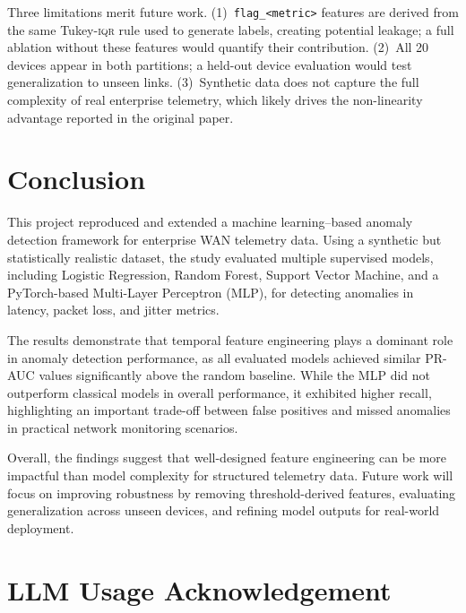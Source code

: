 \documentclass{article}
\newcommand{\iqr}{\textsc{iqr}\xspace}
\begin{document}
Three limitations merit future work.
(1)~\texttt{flag\_<metric>} features are derived from the same Tukey-\iqr rule used
to generate labels, creating potential leakage; a full ablation without these features
would quantify their contribution.
(2)~All 20 devices appear in both partitions; a held-out device evaluation would test
generalization to unseen links.
(3)~Synthetic data does not capture the full complexity of real enterprise telemetry,
which likely drives the non-linearity advantage reported in the original paper.

\section{Conclusion}
\label{sec:conclusion}
This project reproduced and extended a machine learning–based anomaly detection 
framework for enterprise WAN telemetry data. Using a synthetic but statistically 
realistic dataset, the study evaluated multiple supervised models, including 
Logistic Regression, Random Forest, Support Vector Machine, and a PyTorch-based 
Multi-Layer Perceptron (MLP), for detecting anomalies in latency, packet loss, 
and jitter metrics.

The results demonstrate that temporal feature engineering plays a dominant role 
in anomaly detection performance, as all evaluated models achieved similar PR-AUC 
values significantly above the random baseline. While the MLP did not outperform 
classical models in overall performance, it exhibited higher recall, highlighting 
an important trade-off between false positives and missed anomalies in practical 
network monitoring scenarios.

Overall, the findings suggest that well-designed feature engineering can be more 
impactful than model complexity for structured telemetry data. Future work will 
focus on improving robustness by removing threshold-derived features, evaluating 
generalization across unseen devices, and refining model outputs for real-world 
deployment.

\section*{LLM Usage Acknowledgement}
\end{document}
